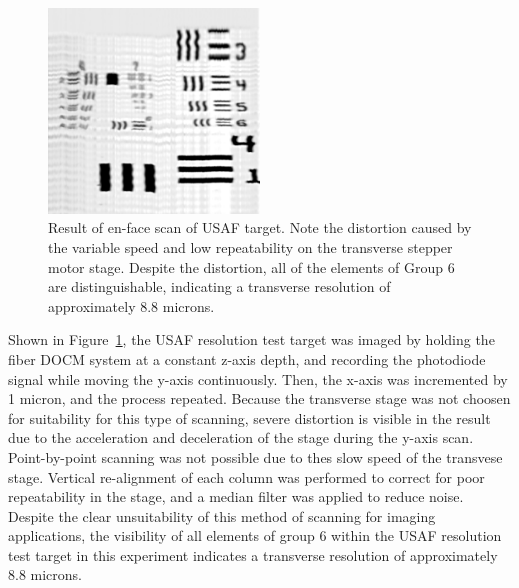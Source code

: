 \begin{figure}[h!]
\centering
\includegraphics[width=0.5\textwidth]{Images/Results/en-face-usaf.png}
\caption[Result of en-face scan of USAF target.]{Result of en-face scan of USAF target. Note the distortion caused by the variable speed and low repeatability on the transverse stepper motor stage. Despite the distortion, all of the elements of Group 6 are distinguishable, indicating a transverse resolution of approximately 8.8 microns.\label{fig:usaf}}
\end{figure}

Shown in Figure~\ref{fig:usaf}, the USAF resolution test target was imaged by holding the fiber DOCM system at a constant z-axis depth, and recording the photodiode signal while moving the y-axis continuously. Then, the x-axis was incremented by 1 micron, and the process repeated. Because the transverse stage was not choosen for suitability for this type of scanning, severe distortion is visible in the result due to the acceleration and deceleration of the stage during the y-axis scan. Point-by-point scanning was not possible due to thes slow speed of the transvese stage. Vertical re-alignment of each column was performed to correct for poor repeatability in the stage, and a median filter was applied to reduce noise. Despite the clear unsuitability of this method of scanning for imaging applications, the visibility of all elements of group 6 within the USAF resolution test target in this experiment indicates a transverse resolution of approximately 8.8 microns.

